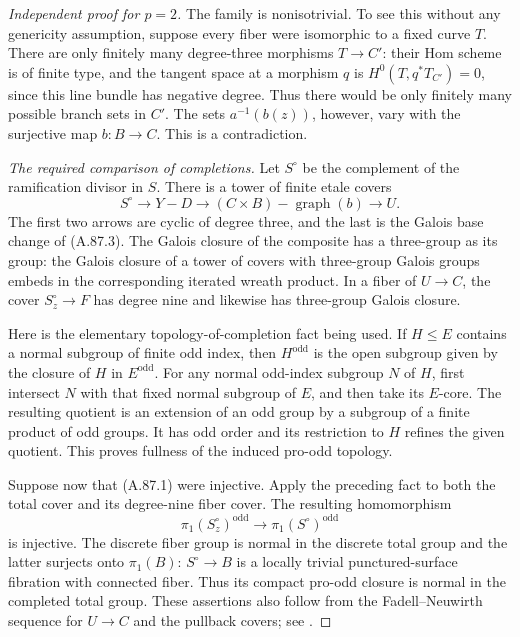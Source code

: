 \documentclass[11pt]{article}
\begin{document}
\begin{proof}[Independent proof for \(p=2\)]
The family is nonisotrivial. To see this without any genericity
assumption, suppose every fiber were isomorphic to a fixed curve
\(T\). There are only finitely many degree-three morphisms
\(T\to C'\): their Hom scheme is of finite type, and the tangent
space at a morphism \(q\) is
\(H^0(T,q^*T_{C'})=0\), since this line bundle has negative
degree. Thus there would be only finitely many possible branch
sets in \(C'\). The sets \(a^{-1}(b(z))\), however, vary with
the surjective map \(b:B\to C\). This is a contradiction.

\emph{The required comparison of completions.}
Let \(S^\circ\) be the complement of the ramification divisor
in \(S\). There is a tower of finite etale covers
\[
 S^\circ\longrightarrow Y-D
 \longrightarrow (C\times B)-\operatorname{graph}(b)
 \longrightarrow U.                                 \tag{A.87.7}
\]
The first two arrows are cyclic of degree three, and the last is
the Galois base change of (A.87.3). The Galois closure of the
composite has a three-group as its group: the Galois closure of a
tower of covers with three-group Galois groups embeds in the
corresponding iterated wreath product. In a fiber of \(U\to C\),
the cover \(S_z^\circ\to F\) has degree nine and likewise has
three-group Galois closure.

Here is the elementary topology-of-completion fact being used.
If \(H\leq E\) contains a normal subgroup of finite odd index,
then \(H^{\mathrm{odd}}\) is the open subgroup given by the
closure of \(H\) in \(E^{\mathrm{odd}}\). For any normal
odd-index subgroup \(N\) of \(H\), first intersect \(N\)
with that fixed normal subgroup of \(E\), and then take its
\(E\)-core. The resulting quotient is an extension of an odd
group by a subgroup of a finite product of odd groups. It has
odd order and its restriction to \(H\) refines the given
quotient. This proves fullness of the induced pro-odd topology.

Suppose now that (A.87.1) were injective. Apply the preceding
fact to both the total cover and its degree-nine fiber cover.
The resulting homomorphism
\[
 \pi_1(S_z^\circ)^{\mathrm{odd}}\longrightarrow
                 \pi_1(S^\circ)^{\mathrm{odd}}        \tag{A.87.8}
\]
is injective. The discrete fiber group is normal in the discrete
total group and the latter surjects onto \(\pi_1(B)\):
\(S^\circ\to B\) is a locally trivial punctured-surface
fibration with connected fiber. Thus its compact pro-odd closure
is normal in the completed total group. These assertions also
follow from the Fadell--Neuwirth sequence for \(U\to C\) and
the pullback covers; see \cite[Section 2.1]{AG_Bellingeri2004}.


\end{proof}
\end{document}
